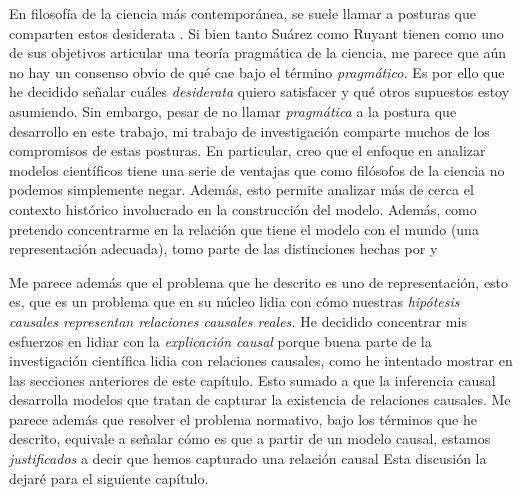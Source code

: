 En filosofía de la ciencia más contemporánea, se suele
llamar  a posturas que comparten estos
desiderata \parencite{Suarez2024, Creath2023,
scientific-theories, Ruyant2021}. Si bien tanto Suárez como
Ruyant tienen como uno de sus objetivos articular una teoría
pragmática de la ciencia, me parece que aún no hay un
consenso obvio de qué cae bajo el término \emph{pragmático.}
Es por ello que he decidido señalar cuáles \emph{desiderata} quiero
satisfacer y qué otros supuestos estoy asumiendo. Sin embargo, pesar de no llamar \emph{pragmática} a la postura que
desarrollo en este trabajo, mi trabajo de investigación
comparte muchos de los compromisos de estas posturas. En
particular, creo que el enfoque en analizar modelos
científicos tiene una serie de ventajas que como filósofos
de la ciencia no podemos simplemente negar. Además, esto
permite analizar más de cerca el contexto histórico
involucrado en la construcción del modelo. Además, como
pretendo concentrarme en la relación que tiene el modelo con
el mundo (una representación adecuada), tomo parte de
las distinciones hechas por \parencite{Ruyant2021} y
\parencite{Suarez2024}

Me parece además que el problema que he descrito es
uno de representación, esto es, que es un problema que en su
núcleo lidia con cómo nuestras \emph{hipótesis causales
representan relaciones causales reales.} He decidido
concentrar mis esfuerzos en lidiar con la \emph{explicación
causal} porque buena parte de la investigación científica
lidia con relaciones causales, como he intentado mostrar en
las secciones anteriores de este capítulo. Esto sumado a que la
inferencia causal desarrolla modelos que tratan de capturar
la existencia de relaciones causales. Me parece además
que resolver el problema normativo, bajo los términos
que he descrito, equivale a señalar cómo es que
a partir de un modelo causal, estamos \emph{justificados} a
decir que hemos capturado una relación causal 
Esta discusión la dejaré para el siguiente capítulo.

